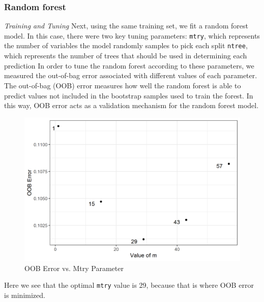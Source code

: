 \documentclass[
]{article}
\begin{document}
\hypertarget{random-forest}{%
\subsubsection{Random forest}\label{random-forest}}

\emph{Training and Tuning}
Next, using the same training set, we fit a random forest model. In this case, there were two key tuning parameters:
\texttt{mtry}, which represents the number of variables the model randomly samples to pick each split
\texttt{ntree}, which represents the number of trees that should be used in determining each prediction
In order to tune the random forest according to these parameters, we measured the out-of-bag error associated with different values of each parameter. The out-of-bag (OOB) error measures how well the random forest is able to predict values not included in the bootstrap samples used to train the forest. In this way, OOB error acts as a validation mechanism for the random forest model.

\begin{figure}

{\centering \includegraphics[width=0.8\linewidth]{../results/m_OOB_err_plot} 

}

\caption{OOB Error vs. Mtry Parameter}\label{fig:m-OOB-err-plot}
\end{figure}

Here we see that the optimal \texttt{mtry} value is 29, because that is where OOB error is minimized.
\end{document}
